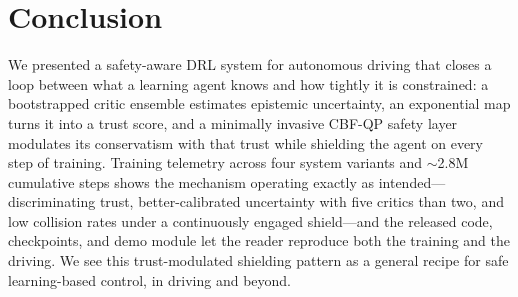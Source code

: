 \documentclass[conference]{IEEEtran}
\begin{document}
\section{Conclusion}
We presented a safety-aware DRL system for autonomous driving that closes a loop between what a learning agent knows and how tightly it is constrained: a bootstrapped critic ensemble estimates epistemic uncertainty, an exponential map turns it into a trust score, and a minimally invasive CBF-QP safety layer modulates its conservatism with that trust while shielding the agent on every step of training. Training telemetry across four system variants and $\sim$2.8M cumulative steps shows the mechanism operating exactly as intended---discriminating trust, better-calibrated uncertainty with five critics than two, and low collision rates under a continuously engaged shield---and the released code, checkpoints, and demo module let the reader reproduce both the training and the driving. We see this trust-modulated shielding pattern as a general recipe for safe learning-based control, in driving and beyond.



\end{document}
